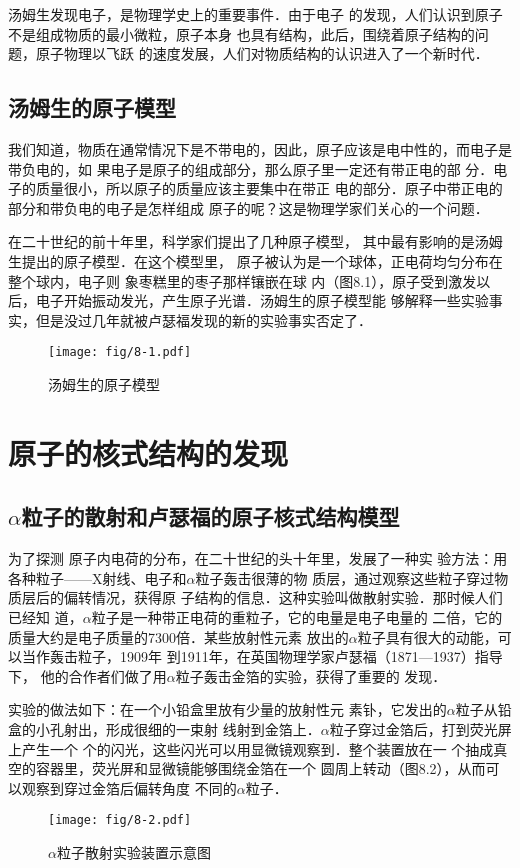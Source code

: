 汤姆生发现电子，是物理学史上的重要事件．由于电子
的发现，人们认识到原子不是组成物质的最小微粒，原子本身
也具有结构，此后，围绕着原子结构的问题，原子物理以飞跃
的速度发展，人们对物质结构的认识进入了一个新时代．

\subsection{汤姆生的原子模型}

我们知道，物质在通常情况下是不带电的，因此，原子应该是电中性的，而电子是带负电的，如
果电子是原子的组成部分，那么原子里一定还有带正电的部
分．电子的质量很小，所以原子的质量应该主要集中在带正
电的部分．原子中带正电的部分和带负电的电子是怎样组成
原子的呢？这是物理学家们关心的一个问题．

在二十世纪的前十年里，科学家们提出了几种原子模型，
其中最有影响的是汤姆生提出的原子模型．在这个模型里，
原子被认为是一个球体，正电荷均匀分布在整个球内，电子则
象枣糕里的枣子那样镶嵌在球
内（图8.1），原子受到激发以后，电子开始振动发光，产生原子光谱．汤姆生的原子模型能
够解释一些实验事实，但是没过几年就被卢瑟福发现的新的实验事实否定了．
\begin{figure}[htp]
    \centering
    \texttt{[image: fig/8-1.pdf]}
    \caption{汤姆生的原子模型}
\end{figure}

\section{原子的核式结构的发现}
\subsection{$\alpha$粒子的散射和卢瑟福的原子核式结构模型} 

为了探测
原子内电荷的分布，在二十世纪的头十年里，发展了一种实
验方法：用各种粒子——X射线、电子和$\alpha$粒子轰击很薄的物
质层，通过观察这些粒子穿过物质层后的偏转情况，获得原
子结构的信息．这种实验叫做散射实验．那时候人们已经知
道，$\alpha$粒子是一种带正电荷的重粒子，它的电量是电子电量的
二倍，它的质量大约是电子质量的7300倍．某些放射性元素
放出的$\alpha$粒子具有很大的动能，可以当作轰击粒子，1909年
到1911年，在英国物理学家卢瑟福（1871—1937）指导下，
他的合作者们做了用$\alpha$粒子轰击金箔的实验，获得了重要的
发现．

实验的做法如下：在一个小铅盒里放有少量的放射性元
素钋，它发出的$\alpha$粒子从铅盒的小孔射出，形成很细的一束射
线射到金箔上．$\alpha$粒子穿过金箔后，打到荧光屏上产生一个
个的闪光，这些闪光可以用显微镜观察到．整个装置放在一
个抽成真空的容器里，荧光屏和显微镜能够围绕金箔在一个
圆周上转动（图8.2），从而可以观察到穿过金箔后偏转角度
不同的$\alpha$粒子．
\begin{figure}[htp]
    \centering
    \texttt{[image: fig/8-2.pdf]}
    \caption{$\alpha$粒子散射实验装置示意图}
\end{figure}

